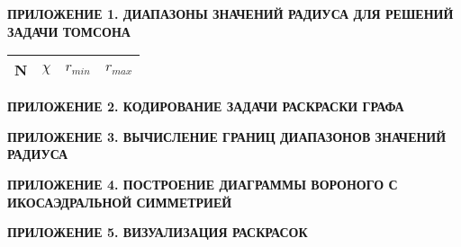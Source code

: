 


\lstset{style=mystyle}


\newpage
\begin{center}
\noindent\textbf{ПРИЛОЖЕНИЕ 1. ДИАПАЗОНЫ ЗНАЧЕНИЙ РАДИУСА ДЛЯ РЕШЕНИЙ ЗАДАЧИ ТОМСОНА}\label{attachments:1}
\vspace{1.5mm}
\end{center}

\begin{longtable}{ccll} 
\hline
N & $\chi$ & $r_{min}$ & $r_{max}$ \\ 
\hline
\endhead

\hline
\end{longtable}

\newpage
\begin{center}
\noindent\textbf{ПРИЛОЖЕНИЕ 2. КОДИРОВАНИЕ ЗАДАЧИ РАСКРАСКИ ГРАФА}\label{attachments:2}
\vspace{1.5mm}
\end{center}



\newpage
\begin{center}
\noindent\textbf{ПРИЛОЖЕНИЕ 3. ВЫЧИСЛЕНИЕ ГРАНИЦ ДИАПАЗОНОВ ЗНАЧЕНИЙ РАДИУСА}\label{attachments:3}
\vspace{1.5mm}
\end{center}



\newpage
\begin{center}
\noindent\textbf{ПРИЛОЖЕНИЕ 4. ПОСТРОЕНИЕ ДИАГРАММЫ ВОРОНОГО С ИКОСАЭДРАЛЬНОЙ СИММЕТРИЕЙ}\label{attachments:4}
\vspace{1.5mm}
\end{center}



\newpage
\begin{center}
\noindent\textbf{ПРИЛОЖЕНИЕ 5. ВИЗУАЛИЗАЦИЯ РАСКРАСОК}\label{attachments:5}
\vspace{1.5mm}
\end{center}




